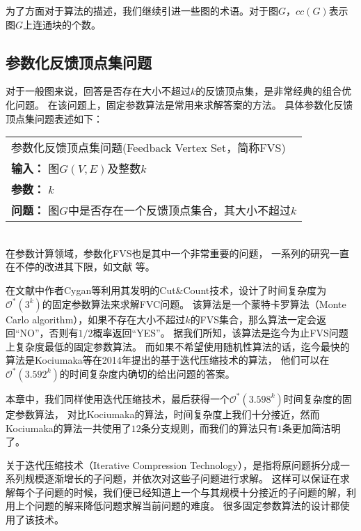 为了方面对于算法的描述，我们继续引进一些图的术语。对于图$G$，$cc(G)$表示图$G$上连通块的个数。

\subsection{参数化反馈顶点集问题}
对于一般图来说，回答是否存在大小不超过$k$的反馈顶点集，是非常经典的组合优化问题。
在该问题上，固定参数算法是常用来求解答案的方法。
具体参数化反馈顶点集问题表述如下：\\

\begin{tabular}{| p{0.9\headwidth} |}
  \hline
  参数化反馈顶点集问题(Feedback Vertex Set，简称FVS) \\
  \textbf{输入：} 图$G(V, E)$及整数$k$ \\
  \textbf{参数：} $k$\\
  \textbf{问题：} 图$G$中是否存在一个反馈顶点集合，其大小不超过$k$\\
  \hline
\end{tabular} \vspace{0.5cm} \\

在参数计算领域，参数化FVS也是其中一个非常重要的问题，
一系列的研究一直在不停的改进其下限，如文献\cite{bodlaender1994disjoint,downey1992fixed,downey2012parameterized,raman2006faster,kanj2004parameterized,dehne20072o,guo2006compression,chen2008improved,cao2010feedback,cygan2011solving,kociumaka2014faster} 等。

在文献\cite{cygan2011solving}中作者Cygan等利用其发明的Cut\&Count技术，设计了时间复杂度为$\mathcal{O}^*(3^k)$的固定参数算法来求解FVC问题。
该算法是一个蒙特卡罗算法（Monte Carlo algorithm），如果不存在大小不超过$k$的FVS集合，那么算法一定会返回“NO”，否则有$1/2$概率返回“YES”。
据我们所知，该算法是迄今为止FVS问题上复杂度最低的固定参数算法。
而如果不希望使用随机性算法的话，迄今最快的算法是Kociumaka等在2014年提出的基于迭代压缩技术的算法，
他们可以在$\mathcal{O}^*(3.592^k)$的时间复杂度内确切的给出问题的答案。

本章中，我们同样使用迭代压缩技术，最后获得一个$\mathcal{O}^*(3.598^k)$时间复杂度的固定参数算法，
对比Kociumaka的算法，时间复杂度上我们十分接近，然而Kociumaka的算法一共使用了$12$条分支规则，而我们的算法只有$1$条更加简洁明了。

关于迭代压缩技术（Iterative Compression Technology），是指将原问题拆分成一系列规模逐渐增长的子问题，并依次对这些子问题进行求解。
这样可以保证在求解每个子问题的时候，我们便已经知道上一个与其规模十分接近的子问题的解，利用上个问题的解来降低问题求解当前问题的难度。
很多固定参数算法的设计都使用了该技术。

